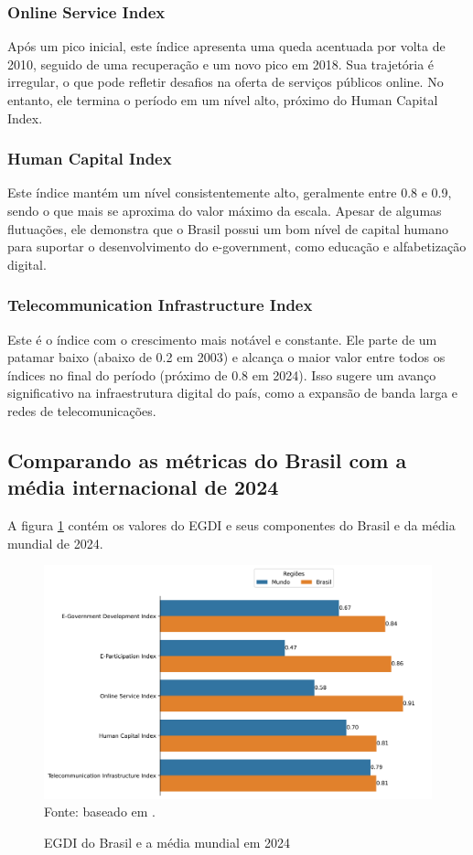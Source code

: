\subsubsection{Online Service Index} Após um pico inicial, este índice apresenta uma queda acentuada por volta de 2010, seguido de uma recuperação e um novo pico em 2018. Sua trajetória é irregular, o que pode refletir desafios na oferta de serviços públicos online. No entanto, ele termina o período em um nível alto, próximo do Human Capital Index.

\subsubsection{Human Capital Index} Este índice mantém um nível consistentemente alto, geralmente entre 0.8 e 0.9, sendo o que mais se aproxima do valor máximo da escala. Apesar de algumas flutuações, ele demonstra que o Brasil possui um bom nível de capital humano para suportar o desenvolvimento do e-government, como educação e alfabetização digital.

\subsubsection{Telecommunication Infrastructure Index} Este é o índice com o crescimento mais notável e constante. Ele parte de um patamar baixo (abaixo de 0.2 em 2003) e alcança o maior valor entre todos os índices no final do período (próximo de 0.8 em 2024). Isso sugere um avanço significativo na infraestrutura digital do país, como a expansão de banda larga e redes de telecomunicações.

\subsection{Comparando as métricas do Brasil com a média internacional de 2024}

A figura \ref{fig:barplot_egdi_mediamundial_brasil} contém os valores do EGDI e seus componentes do Brasil e da média mundial de 2024.

\begin{figure}[H]
	\centering
	\caption{EGDI do Brasil e a média mundial em 2024}
	\includegraphics[width=1\linewidth]{figuras/egdi/barplot_egdi_mediamundial_brasil}
	\label{fig:barplot_egdi_mediamundial_brasil}
	\footnotesize{Fonte: baseado em \cite{ONU_EGDI_mapa}.}
\end{figure}

